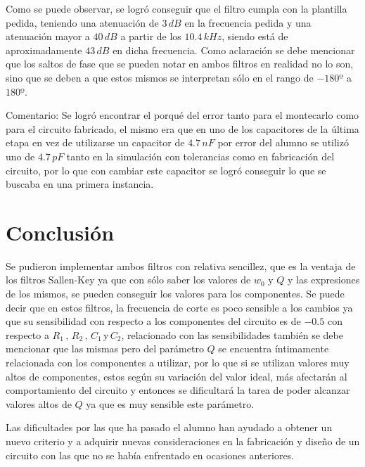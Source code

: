	Como se puede observar, se logró conseguir que el filtro cumpla con la plantilla pedida, teniendo una atenuación de $3 \, dB$ en la frecuencia pedida y una atenuación mayor a $40 \, dB$ a partir de los $10.4 \, kHz$, siendo está de aproximadamente $43 \, dB$ en dicha frecuencia.
	Como aclaración se debe mencionar que los saltos de fase que se pueden notar en ambos filtros en realidad no lo son, sino que se deben a que estos mismos se interpretan sólo en el rango de $-180º$ a $180º$.
	
	Comentario: Se logró encontrar el porqué del error tanto para el montecarlo como para el circuito fabricado, el mismo era que en uno de los capacitores de la última etapa en vez de utilizarse un capacitor de $4.7 \, nF$ por error del alumno se utilizó uno de $4.7 \, pF$ tanto en la simulación con tolerancias como en fabricación del circuito, por lo que con cambiar este capacitor se logró conseguir lo que se buscaba en una primera instancia.

\section{Conclusión}

	Se pudieron implementar ambos filtros con relativa sencillez, que es la ventaja de los filtros Sallen-Key ya que con sólo saber los valores de $w_0$ y $Q$ y las expresiones de los mismos, se pueden conseguir los valores para los componentes. Se puede decir que en estos filtros, la frecuencia de corte es poco sensible a los cambios ya que su sensibilidad con respecto a los componentes del circuito es de $-0.5$ con respecto a $R_1 \, , \, R_2 \, , \, C_1 \, \text{y} \, C_2 $, relacionado con las sensibilidades también se debe mencionar que las mismas pero del parámetro $Q$ se encuentra íntimamente relacionada con los componentes a utilizar, por lo que si se utilizan valores muy altos de componentes, estos según su variación del valor ideal, más afectarán al comportamiento del circuito y entonces se dificultará la tarea de poder alcanzar valores altos de $Q$ ya que es muy sensible este parámetro.
	
	Las dificultades por las que ha pasado el alumno han ayudado a obtener un nuevo criterio y a adquirir nuevas consideraciones en la fabricación y diseño de un circuito con las que no se había enfrentado en ocasiones anteriores.